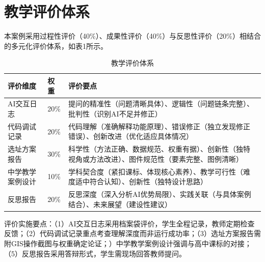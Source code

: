 \section{教学评价体系}

本案例采用过程性评价（40\%）、成果性评价（40\%）与反思性评价（20\%）相结合的多元化评价体系，如表1所示。

\begin{table}[htbp]
\centering
\caption{教学评价体系}
\begin{tabular}{p{3.5cm}p{2cm}p{8cm}}
\toprule
\textbf{评价维度} & \textbf{权重} & \textbf{评价要点} \\
\midrule
AI交互日志 & 20\% & 提问的精准性（问题清晰具体）、逻辑性（问题链条完整）、批判性（识别AI不足并修正） \\
\midrule
代码调试记录 & 20\% & 代码理解（准确解释功能原理）、错误修正（独立发现修正错误）、创新改进（优化适应具体情况） \\
\midrule
选址方案报告 & 30\% & 科学性（方法正确、数据规范、权重有据）、创新性（独特视角或方法改进）、图件规范性（要素完整、图例清晰） \\
\midrule
中学教学案例设计 & 10\% & 学科契合度（紧扣课标、体现核心素养）、教学可行性（难度适中符合认知）、创新性（独特设计思路） \\
\midrule
反思报告 & 20\% & 反思深度（深入分析AI优势局限）、实践关联（与具体案例结合）、未来展望（建设性建议） \\
\bottomrule
\end{tabular}
\end{table}

评价实施要点：（1）AI交互日志采用档案袋评价，学生全程记录，教师定期检查反馈；（2）代码调试记录重点考查理解深度而非运行成功率；（3）选址方案报告需附GIS操作截图与权重确定论证；）中学教学案例设计强调与高中课标的对接；（5）反思报告采用答辩形式，学生需现场回答教师提问。